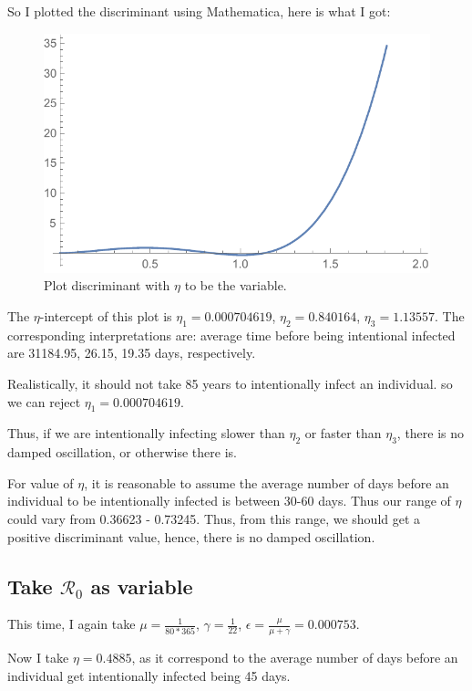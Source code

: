 \documentclass[12pt]{article}
\begin{document}
So I plotted the discriminant using Mathematica, here is what I got:

\begin{figure}[h!]
  \caption{Plot discriminant with $\eta$ to be the variable.}
  \centering
  \includegraphics[width=1\textwidth]{Figures/Discriminant_plot_S.pdf}
\end{figure}

The $\eta$-intercept of this plot is $\eta_1=0.000704619$, $\eta_2=0.840164$, $\eta_3=1.13557$. The corresponding interpretations are: average time before being intentional infected are 31184.95, 26.15, 19.35 days, respectively.

Realistically, it should not take 85 years to intentionally infect an individual. so we can reject $\eta_1=0.000704619$.

Thus, if we are intentionally infecting slower than $\eta_2$ or faster than $\eta_3$, there is no damped oscillation, or otherwise there is.

For value of $\eta$, it is reasonable to assume the average number of days before an individual to be intentionally infected is between 30-60 days. Thus our range of $\eta$ could vary from 0.36623 - 0.73245. Thus, from this range, we should get a positive discriminant value, hence, there is no damped oscillation.

\subsection{Take $\mathcal{R}_0$ as variable}

This time, I again take $\mu=\frac{1}{80*365}$, $\gamma=\frac{1}{22}$, $\epsilon=\frac{\mu}{\mu+\gamma}=0.000753$. 

Now I take $\eta=0.4885$, as it correspond to the average number of days before an individual get intentionally infected being 45 days.
\end{document}
